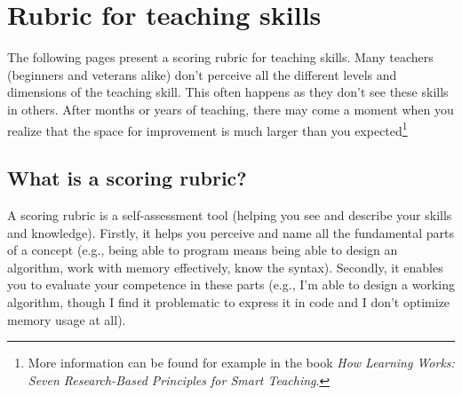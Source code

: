 
\newcommand{\rubriccriterion}[4]{
\stepcounter{rubricquestion}
\section*{\therubricquestion: #1}

\smallskip
\note{Unaware:} #2

\note{Beginner:} #3

\note{Guru:} #4

\medskip
\begin{tikzpicture}
\draw (0,0) -- (8,0);
\foreach \i in {0,1,...,8} %
{
\fill[black] (\i,0) circle (1.5 mm);
\fill[white] (\i,0) circle (1.4 mm);
}
\node at (0.15, -0.5) {unaware};
\node at (3, -0.5)    {beginner};
\node at (8, -0.5)    {guru};
\end{tikzpicture}
}

\restoregeometry
\chapter*{Rubric for teaching skills}
\label{rubric}

The following pages present a scoring rubric for teaching skills. Many teachers (beginners and veterans alike) don't perceive all the different levels and dimensions of the teaching skill. This often happens as they don't see these skills in others. After months or years of teaching, there may come a moment when you realize that the space for improvement is much larger than you expected\footnote{More information can be found for example in the book \emph{How Learning Works: Seven Research-Based Principles for Smart Teaching}.}

\section*{What is a scoring rubric?}

A scoring rubric is a self-assessment tool (helping you see and describe your skills and knowledge).
Firstly, it helps you perceive and name all the fundamental parts of a concept (e.g., being able to program means being able to design an algorithm, work with memory effectively, know the syntax). Secondly, it enables you to evaluate your competence in these parts (e.g., I'm able to design a working algorithm, though I find it problematic to express it in code and I don't optimize memory usage at all).

